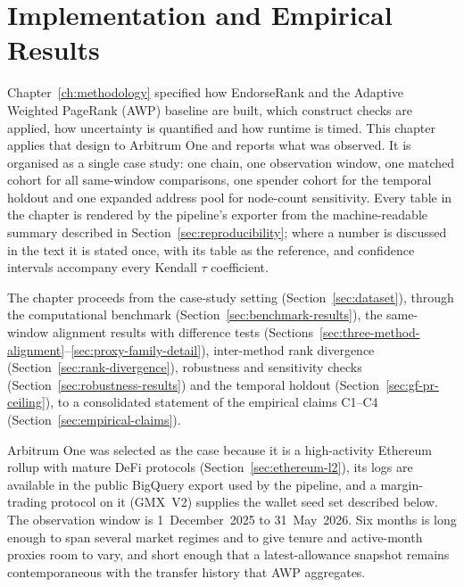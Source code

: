 \chapter{Implementation and Empirical Results}
\label{ch:results}

Chapter~\ref{ch:methodology} specified how EndorseRank and the Adaptive Weighted PageRank (AWP) baseline are built, which construct checks are applied, how uncertainty is quantified and how runtime is timed. This chapter applies that design to Arbitrum One and reports what was observed. It is organised as a single case study: one chain, one observation window, one matched cohort for all same-window comparisons, one spender cohort for the temporal holdout and one expanded address pool for node-count sensitivity. Every table in the chapter is rendered by the pipeline's exporter from the machine-readable summary described in Section~\ref{sec:reproducibility}; where a number is discussed in the text it is stated once, with its table as the reference, and confidence intervals accompany every Kendall $\tau$ coefficient.

The chapter proceeds from the case-study setting (Section~\ref{sec:dataset}), through the computational benchmark (Section~\ref{sec:benchmark-results}), the same-window alignment results with difference tests (Sections~\ref{sec:three-method-alignment}--\ref{sec:proxy-family-detail}), inter-method rank divergence (Section~\ref{sec:rank-divergence}), robustness and sensitivity checks (Section~\ref{sec:robustness-results}) and the temporal holdout (Section~\ref{sec:gf-pr-ceiling}), to a consolidated statement of the empirical claims C1--C4 (Section~\ref{sec:empirical-claims}).


Arbitrum One was selected as the case because it is a high-activity Ethereum rollup with mature DeFi protocols (Section~\ref{sec:ethereum-l2}), its logs are available in the public BigQuery export used by the pipeline, and a margin-trading protocol on it (GMX~V2) supplies the wallet seed set described below. The observation window is 1~December~2025 to 31~May~2026. Six months is long enough to span several market regimes and to give tenure and active-month proxies room to vary, and short enough that a latest-allowance snapshot remains contemporaneous with the transfer history that AWP aggregates.


